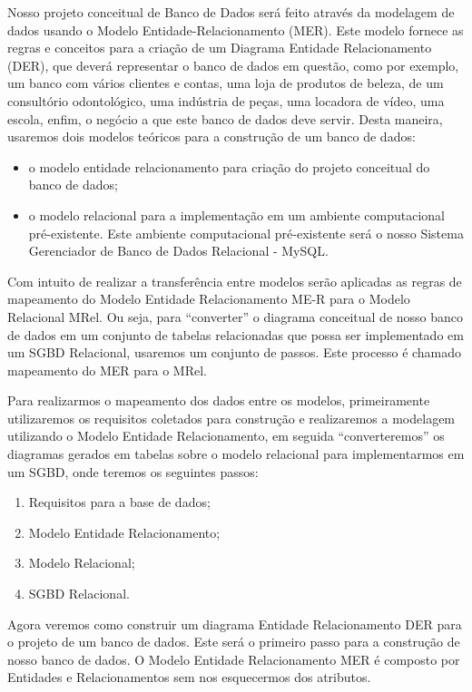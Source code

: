 \documentclass{article}
\begin{document}
Nosso projeto conceitual de Banco de Dados será feito através da modelagem de dados usando o Modelo Entidade-Relacionamento (MER). Este modelo fornece as regras e conceitos para a criação de um Diagrama Entidade Relacionamento (DER), que deverá representar o banco de dados em questão, como por exemplo, um banco com vários clientes e contas, uma loja de produtos de beleza, de um consultório odontológico, uma indústria de peças, uma locadora de vídeo, uma escola, enfim, o negócio a que este banco de dados deve servir. Desta maneira, usaremos dois modelos teóricos para a construção de um banco de dados:

\begin{itemize}
    \item o modelo entidade relacionamento para criação do projeto conceitual do banco de dados;
    \item o modelo relacional para a implementação em um ambiente computacional pré-existente. Este ambiente computacional pré-existente será o nosso Sistema Gerenciador de Banco de Dados Relacional - MySQL.
\end{itemize}

Com intuito de realizar a transferência entre modelos serão aplicadas as regras de mapeamento do Modelo Entidade Relacionamento ME-R para o Modelo Relacional MRel. Ou seja, para “converter” o diagrama conceitual de nosso banco de dados em um conjunto de tabelas relacionadas que possa ser implementado em um SGBD Relacional, usaremos um conjunto de passos. Este processo é chamado mapeamento do MER para o MRel.

Para realizarmos o mapeamento dos dados entre os modelos, primeiramente utilizaremos os requisitos coletados para construção e realizaremos a modelagem utilizando o Modelo Entidade Relacionamento, em seguida “converteremos” os diagramas gerados em tabelas sobre o modelo relacional para implementarmos em um SGBD, onde teremos os seguintes passos:

\begin{enumerate}
    \item Requisitos para a base de dados;
    \item Modelo Entidade Relacionamento;
    \item Modelo Relacional;
    \item SGBD Relacional.
\end{enumerate}

Agora veremos como construir um diagrama Entidade Relacionamento DER para o projeto de um banco de dados. Este será o primeiro passo para a construção de nosso banco de dados. O Modelo Entidade Relacionamento MER é composto por Entidades e Relacionamentos sem nos esquecermos dos atributos.
\end{document}
